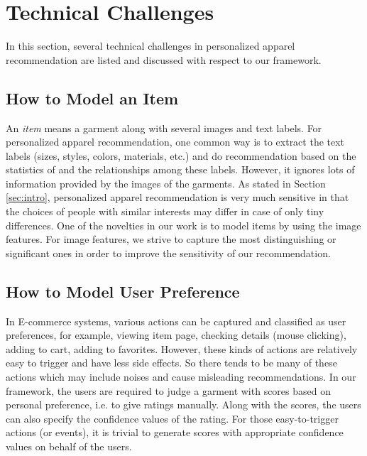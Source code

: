 \section{Technical Challenges}\label{sec:challenge}

In this section, several technical challenges in personalized apparel recommendation 
  are listed and discussed with respect to our framework. 

\subsection{How to Model an Item}
An \emph{item} means a garment along with several images and text labels.
For personalized apparel recommendation, one common way is to extract 
  the text labels (sizes, styles, colors, materials, etc.) and do recommendation 
  based on the statistics of and the relationships among these labels.
However, it ignores lots of information provided by the images of the garments.
As stated in Section \ref{sec:intro}, personalized apparel recommendation is 
  very much sensitive in that the choices of people with similar interests 
  may differ in case of only tiny differences. 
One of the novelties in our work is to model items by using the image features.
For image features, we strive to capture the most distinguishing or significant ones 
  in order to improve the sensitivity of our recommendation.

\subsection{How to Model User Preference}
In E-commerce systems, various actions can be captured and classified as user preferences,
  for example, viewing item page, checking details (mouse clicking), adding to cart, adding to favorites.
However, these kinds of actions are relatively easy to trigger and have less side effects.
So there tends to be many of these actions which may include noises and cause misleading recommendations.
In our framework, the users are required to judge a garment with scores based on personal preference,
  i.e. to give ratings manually.
Along with the scores, the users can also specify the confidence values of the rating. 
For those easy-to-trigger actions (or events), it is trivial to generate scores with appropriate 
  confidence values on behalf of the users.


